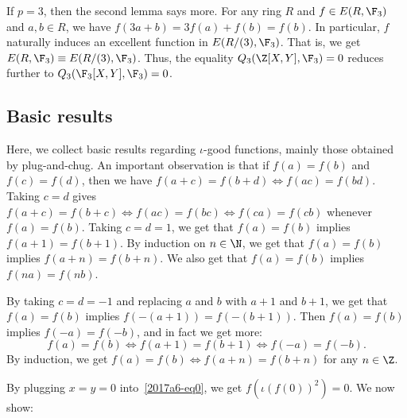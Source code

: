 If $p = 3$, then the second lemma says more.
For any ring $R$ and $f \in E(R, \F_3)$ and $a, b \in R$, we have $f(3a + b) = 3 f(a) + f(b) = f(b)$.
In particular, $f$ naturally induces an excellent function in $E(R/(3), \F_3)$.
That is, we get $E(R, \F_3) \equiv E(R/(3), \F_3)$.
Thus, the equality $Q_3(\Z[X, Y], \F_3) = 0$ reduces further to $Q_3(\F_3[X, Y], \F_3) = 0$.





\subsection*{Basic results}

Here, we collect basic results regarding $\iota$-good functions, mainly those obtained by plug-and-chug.
An important observation is that if $f(a) = f(b)$ and $f(c) = f(d)$, then we have $f(a + c) = f (b + d) \iff f(ac) = f(bd)$.
Taking $c = d$ gives $f(a + c) = f(b + c) \iff f(ac) = f(bc) \iff f(ca) = f(cb)$ whenever $f(a) = f(b)$.
Taking $c = d = 1$, we get that $f(a) = f(b)$ implies $f(a + 1) = f(b + 1)$.
By induction on $n \in \N$, we get that $f(a) = f(b)$ implies $f(a + n) = f(b + n)$.
We also get that $f(a) = f(b)$ implies $f(na) = f(nb)$.

By taking $c = d = -1$ and replacing $a$ and $b$ with $a + 1$ and $b + 1$, we get that $f(a) = f(b)$ implies $f(-(a + 1)) = f(-(b + 1))$.
Then $f(a) = f(b)$ implies $f(-a) = f(-b)$, and in fact we get more:
\[ f(a) = f(b) \iff f(a + 1) = f(b + 1) \iff f(-a) = f(-b). \]
By induction, we get $f(a) = f(b) \iff f(a + n) = f(b + n)$ for any $n \in \Z$.

By plugging $x = y = 0$ into~\eqref{2017a6-eq0}, we get $f(\iota(f(0))^2) = 0$.
We now show:

